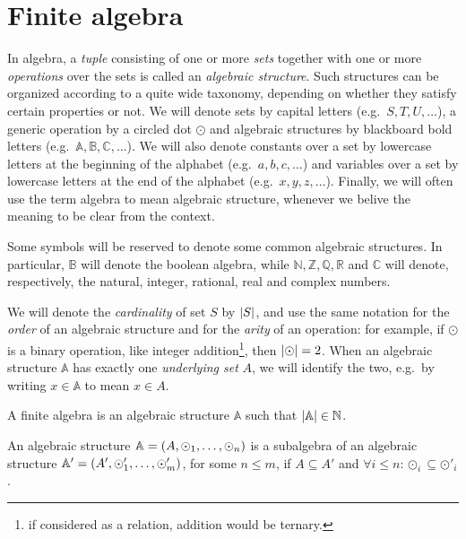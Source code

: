 \section{Finite algebra}\label{sec:prime_fields}
In algebra, a \emph{tuple} consisting of one or more \emph{sets} together with one or more 
\emph{operations} over the sets is called an \emph{algebraic structure}.
Such structures can be organized according to a quite wide taxonomy, depending on whether 
they satisfy certain properties or not. 
We will denote sets by capital letters (e.g.\  \(S, T, U, \dots \)), a generic operation by a 
circled dot \(\odot \) and algebraic structures by blackboard bold letters 
(e.g.\  \(\mathbb{A}, \mathbb{B}, \mathbb{C}, \dots \)).
We will also denote constants over a set by lowercase letters at the beginning of the alphabet 
(e.g.\  \(a, b, c, \dots \)) and variables over a set by lowercase letters at the end of the 
alphabet (e.g.\  \(x, y, z, \dots \)).
Finally, we will often use the term algebra to mean algebraic structure, whenever we belive the 
meaning to be clear from the context.
\begin{remark}
  Some symbols will be reserved to denote some common algebraic structures. 
  In particular, \(\mathbb{B}\) will denote the boolean algebra, while \(\mathbb{N}, \mathbb{Z}, 
  \mathbb{Q}, \mathbb{R}\) and \(\mathbb{C}\) will denote, respectively, the 
  natural, integer, rational, real and complex numbers.
\end{remark}

We will denote the \emph{cardinality} of set \(S\) by \(\left\lvert S\right\rvert\), and use the same notation for 
the \emph{order} of an algebraic structure and for the \emph{arity} of an operation: for example, 
if \(\odot \) is a binary operation, like integer 
addition\footnote{if considered as a relation, addition would be ternary.}, then \(\left\lvert\odot\right\rvert = 2\).
When an algebraic structure \(\mathbb{A}\) has exactly one \emph{underlying set} \(A\), we will identify the two, e.g.\ by writing \(x \in \mathbb{A}\) to mean \(x \in A\).

\begin{definition}
  A finite algebra is an algebraic structure \(\mathbb{A}\) such that \(\left\lvert\mathbb{A}\right\rvert \in \mathbb{N}\).
\end{definition}
\begin{definition}[Subalgebra]
  An algebraic structure \(\mathbb{A} = \left(A, \odot_1, \dots, \odot_n\right)\) is a subalgebra of an algebraic structure \(\mathbb{A}' = \left(A', \odot'_1, \dots, \odot'_m\right)\), for some \(n \le m\), if \(A \subseteq A'\) and \(\forall i \le n\colon \odot_i \subseteq \odot'_i\).
\end{definition}


